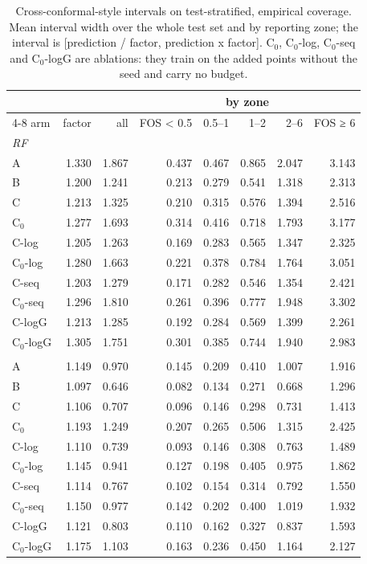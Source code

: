 \begin{table}[htbp]
\centering
\caption{Cross-conformal-style intervals on test-stratified, empirical coverage. Mean interval width over the whole test set and by reporting zone; the interval is [prediction / factor, prediction x factor]. C$_0$, C$_0$-log, C$_0$-seq and C$_0$-logG are ablations: they train on the added points without the seed and carry no budget.}
\label{tab:test-stratified__fos-rmse:conformal:width}
\begin{tabular}{lrrrrrrr}
\toprule
 &  &  & \multicolumn{5}{c}{by zone} \\
\cmidrule(lr){4-8}
arm & factor & all & FOS < 0.5 & 0.5–1 & 1–2 & 2–6 & FOS ≥ 6 \\
\midrule
\multicolumn{8}{l}{\textit{RF}} \\
A & 1.330 & 1.867 & 0.437 & 0.467 & 0.865 & 2.047 & 3.143 \\
B & 1.200 & 1.241 & 0.213 & 0.279 & 0.541 & 1.318 & 2.313 \\
C & 1.213 & 1.325 & 0.210 & 0.315 & 0.576 & 1.394 & 2.516 \\
C$_0$ & 1.277 & 1.693 & 0.314 & 0.416 & 0.718 & 1.793 & 3.177 \\
C-log & 1.205 & 1.263 & 0.169 & 0.283 & 0.565 & 1.347 & 2.325 \\
C$_0$-log & 1.280 & 1.663 & 0.221 & 0.378 & 0.784 & 1.764 & 3.051 \\
C-seq & 1.203 & 1.279 & 0.171 & 0.282 & 0.546 & 1.354 & 2.421 \\
C$_0$-seq & 1.296 & 1.810 & 0.261 & 0.396 & 0.777 & 1.948 & 3.302 \\
C-logG & 1.213 & 1.285 & 0.192 & 0.284 & 0.569 & 1.399 & 2.261 \\
C$_0$-logG & 1.305 & 1.751 & 0.301 & 0.385 & 0.744 & 1.940 & 2.983 \\
\addlinespace
\multicolumn{8}{l}{\textit{GBM}} \\
A & 1.149 & 0.970 & 0.145 & 0.209 & 0.410 & 1.007 & 1.916 \\
B & 1.097 & 0.646 & 0.082 & 0.134 & 0.271 & 0.668 & 1.296 \\
C & 1.106 & 0.707 & 0.096 & 0.146 & 0.298 & 0.731 & 1.413 \\
C$_0$ & 1.193 & 1.249 & 0.207 & 0.265 & 0.506 & 1.315 & 2.425 \\
C-log & 1.110 & 0.739 & 0.093 & 0.146 & 0.308 & 0.763 & 1.489 \\
C$_0$-log & 1.145 & 0.941 & 0.127 & 0.198 & 0.405 & 0.975 & 1.862 \\
C-seq & 1.114 & 0.767 & 0.102 & 0.154 & 0.314 & 0.792 & 1.550 \\
C$_0$-seq & 1.150 & 0.977 & 0.142 & 0.202 & 0.400 & 1.019 & 1.932 \\
C-logG & 1.121 & 0.803 & 0.110 & 0.162 & 0.327 & 0.837 & 1.593 \\
C$_0$-logG & 1.175 & 1.103 & 0.163 & 0.236 & 0.450 & 1.164 & 2.127 \\
\bottomrule
\end{tabular}
\end{table}
